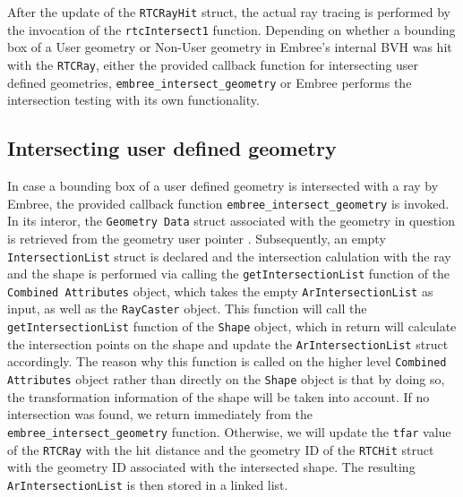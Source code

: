 After the update of the \texttt{RTCRayHit} struct, the actual ray tracing is performed by the invocation of the \texttt{rtcIntersect1} function. Depending on whether a bounding box of a User geometry or Non-User geometry in Embree's internal BVH was hit with the \texttt{RTCRay}, either the provided callback function for intersecting user defined geometries, \texttt{embree\_intersect\_geometry} or Embree performs the intersection testing with its own functionality. 


\subsection{Intersecting user defined geometry}
In case a bounding box of a user defined geometry is intersected with a ray by Embree, the provided callback function \texttt{embree\_intersect\_geometry} is invoked. In its interor, the \texttt{Geometry Data} struct associated with the geometry in question is retrieved from the geometry user pointer . Subsequently, an empty \texttt{IntersectionList}  struct is declared and the intersection calulation with the ray and the shape is performed via calling the \texttt{getIntersectionList} function of the \texttt{Combined Attributes} object, which takes the empty \texttt{ArIntersectionList} as input, as well as the \texttt{RayCaster} object. This function will call the \texttt{getIntersectionList} function of the \texttt{Shape} object, which in return will calculate the intersection points on the shape and update the \texttt{ArIntersectionList} struct accordingly. The reason why this function is called on the higher level \texttt{Combined Attributes} object rather than directly on the \texttt{Shape} object is that by doing so, the transformation information of the shape will be taken into account.
If no intersection was found, we return immediately from the \texttt{embree\_intersect\_geometry} function. Otherwise, we will update the \texttt{tfar} value of the \texttt{RTCRay} with the hit distance and the geometry ID of the \texttt{RTCHit} struct with the geometry ID associated with the intersected shape. 
The resulting \texttt{ArIntersectionList} is then stored in a linked list. 

